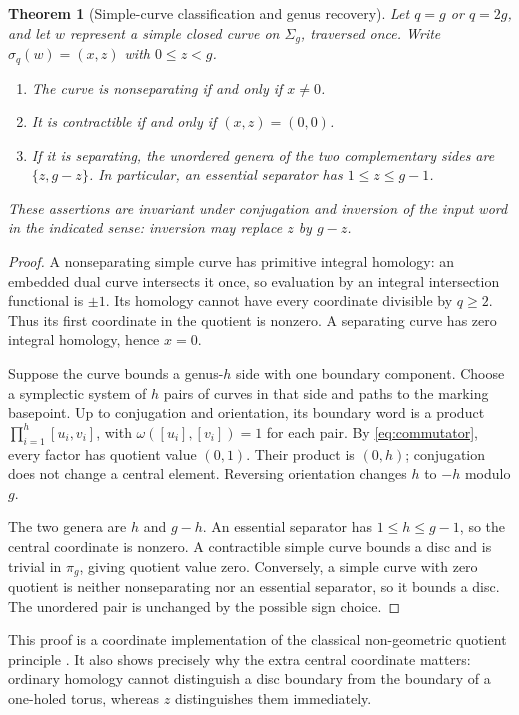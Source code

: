 \documentclass[11pt,letterpaper]{article}
\newtheorem{theorem}{Theorem}[section]
\theoremstyle{definition}
\theoremstyle{remark}
\newcommand{\sig}{\sigma}
\begin{document}
\begin{theorem}[Simple-curve classification and genus recovery]\label{thm:scalar}
Let $q=g$ or $q=2g$, and let $w$ represent a simple closed curve on $\Sigma_g$, traversed once. Write $\sig_q(w)=(x,z)$ with $0\le z<g$.
\begin{enumerate}[label=(\roman*)]
\item The curve is nonseparating if and only if $x\ne0$.
\item It is contractible if and only if $(x,z)=(0,0)$.
\item If it is separating, the unordered genera of the two complementary sides are $\{z,g-z\}$. In particular, an essential separator has $1\le z\le g-1$.
\end{enumerate}
These assertions are invariant under conjugation and inversion of the input word in the indicated sense: inversion may replace $z$ by $g-z$.
\end{theorem}
\begin{proof}
A nonseparating simple curve has primitive integral homology: an embedded dual curve intersects it once, so evaluation by an integral intersection functional is $\pm1$. Its homology cannot have every coordinate divisible by $q\ge2$. Thus its first coordinate in the quotient is nonzero. A separating curve has zero integral homology, hence $x=0$.

Suppose the curve bounds a genus-$h$ side with one boundary component. Choose a symplectic system of $h$ pairs of curves in that side and paths to the marking basepoint. Up to conjugation and orientation, its boundary word is a product $\prod_{i=1}^h[u_i,v_i]$, with $\omega([u_i],[v_i])=1$ for each pair. By \eqref{eq:commutator}, every factor has quotient value $(0,1)$. Their product is $(0,h)$; conjugation does not change a central element. Reversing orientation changes $h$ to $-h$ modulo $g$.

The two genera are $h$ and $g-h$. An essential separator has $1\le h\le g-1$, so the central coordinate is nonzero. A contractible simple curve bounds a disc and is trivial in $\pi_g$, giving quotient value zero. Conversely, a simple curve with zero quotient is neither nonseparating nor an essential separator, so it bounds a disc. The unordered pair is unchanged by the possible sign choice.
\end{proof}

This proof is a coordinate implementation of the classical non-geometric quotient principle \cite{livingston,pikaart}. It also shows precisely why the extra central coordinate matters: ordinary homology cannot distinguish a disc boundary from the boundary of a one-holed torus, whereas $z$ distinguishes them immediately.
\end{document}
